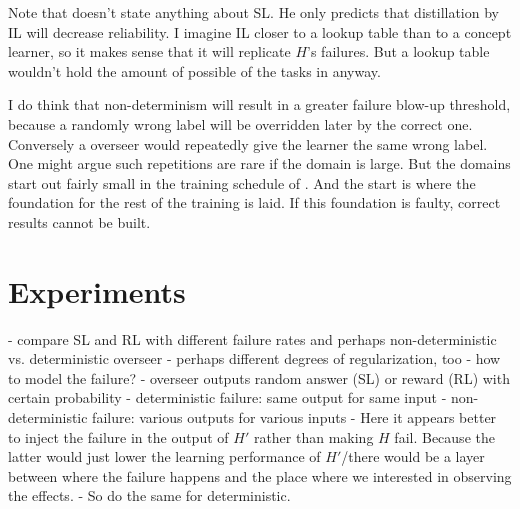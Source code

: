 \documentclass{farlamp}
\begin{document}
Note that \textcite{ChriRelAmp} doesn't state anything about SL. He only
predicts that distillation by IL will decrease reliability. I imagine IL closer
to a lookup table than to a concept learner, so it makes sense that it will
replicate $H$'s failures. But a lookup table wouldn't hold the amount of
possible of the tasks in \textcite{CSASupAmp} anyway.

I do think that non-determinism will result in a greater failure blow-up
threshold, because a randomly wrong label will be overridden later by the
correct one. Conversely a overseer would repeatedly give the learner the same
wrong label. One might argue such repetitions are rare if the domain is large.
But the domains start out fairly small in the training schedule of
\textcite{CSASupAmp}. And the start is where the foundation for the rest of the
training is laid. If this foundation is faulty, correct results cannot be built.


\section{Experiments}

- compare SL and RL with different failure rates and perhaps
non-deterministic vs. deterministic overseer
- perhaps different degrees of regularization, too
- how to model the failure?
    - overseer outputs random answer (SL) or reward (RL) with certain
    probability
    - deterministic failure: same output for same input
    - non-deterministic failure: various outputs for various inputs
    - Here it appears better to inject the failure in the output of $H'$ rather
    than making $H$ fail. Because the latter would just lower the learning
    performance of $H'$/there would be a layer between where the failure happens
    and the place where we interested in observing the effects.
    - So do the same for deterministic.

\printbibliography
\end{document}
